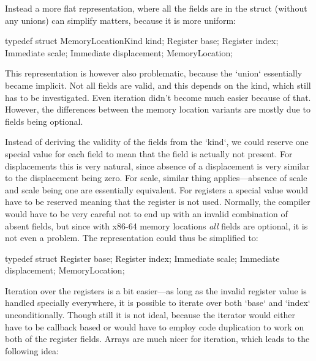 Instead a more flat representation, where all the fields are in the struct
(without any unions) can simplify matters, because it is more uniform:

\begtt
typedef struct {
	MemoryLocationKind kind;
	Register base;
	Register index;
	Immediate scale;
	Immediate displacement;
} MemoryLocation;
\endtt

This representation is however also problematic, because the `union` essentially
became implicit. Not all fields are valid, and this depends on the kind, which
still has to be investigated. Even iteration didn't become much easier because
of that. However, the differences between the memory location variants are
mostly due to fields being optional.

Instead of deriving the validity of the fields from the `kind`, we could reserve
one special value for each field to mean that the field is actually not present.
For displacements this is very natural, since absence of a displacement is very
similar to the displacement being zero. For scale, similar thing applies---absence of
scale and scale being one are essentially equivalent. For registers a special value would
have to be reserved meaning that the register is not used. Normally, the
compiler would have to be very careful not to end up with an invalid combination
of absent fields, but since with x86-64 memory locations {\em all} fields are
optional, it is not even a problem. The representation could thus be simplified
to:

\begtt
typedef struct {
	Register base;
	Register index;
	Immediate scale;
	Immediate displacement;
} MemoryLocation;
\endtt

Iteration over the registers is a bit easier---as long as the invalid register
value is handled specially everywhere, it is possible to iterate over both
`base` and `index` unconditionally. Though still it is not ideal, because the
iterator would either have to be callback based or would have to employ code
duplication to work on both of the register fields. Arrays are much nicer for
iteration, which leads to the following idea:

